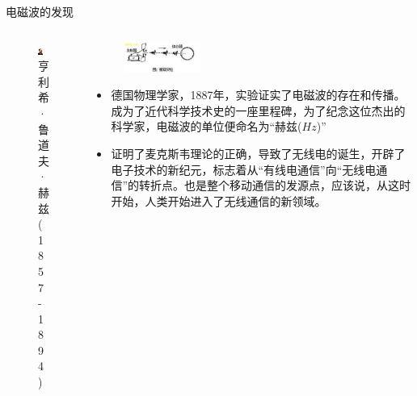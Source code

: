 \documentclass{ctexbeamer}
\begin{document}
\begin{frame}{电磁波的发现}
  \begin{columns}
    \begin{column}{0.35\linewidth}
      \begin{figure}
        \includegraphics[width=3cm]{hertz.jpg}
        \caption{亨利希·鲁道夫·赫兹(1857 - 1894)}
      \end{figure}
    \end{column}
    \begin{column}{0.65\linewidth}
      \begin{figure}
        \flushright
        \includegraphics[width=2.5cm]{hertzexperiment.jpg}
      \end{figure}
      \begin{itemize}
        \item 德国物理学家，1887年，实验证实了电磁波的存在和传播。成为了近代科学技术史的一座里程碑，为了纪念这位杰出的科学家，电磁波的单位便命名为“赫兹($Hz$)”
        \item 证明了麦克斯韦理论的正确，导致了无线电的诞生，开辟了电子技术的新纪元，标志着从“有线电通信”向“无线电通信”的转折点。也是整个移动通信的发源点，应该说，从这时开始，人类开始进入了无线通信的新领域。
      \end{itemize}
    \end{column}
  \end{columns}
\end{frame}
\end{document}
